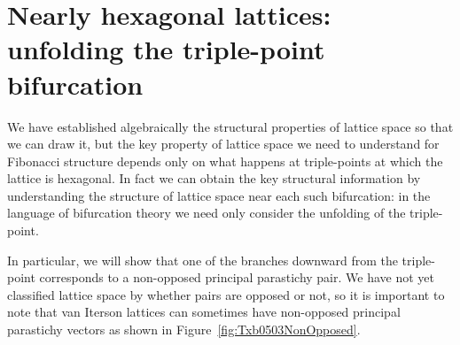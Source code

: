 \section[Unfolding the triple-point bifurcation]{Nearly hexagonal lattices: unfolding the triple-point bifurcation}
We have established algebraically the structural properties of lattice space so that we can draw it, but the key property of lattice space we need to understand for Fibonacci structure depends only on what happens at triple-points at which the lattice is hexagonal. In fact we can obtain the key structural information by understanding the structure of lattice space near each such bifurcation: in the language of bifurcation theory we need only consider the unfolding of the triple-point.  

In particular, we will show that one of the branches downward from the triple-point corresponds to a non-opposed principal parastichy pair. We have not yet classified lattice space by whether pairs are opposed or not, so it is important to note that van Iterson lattices can sometimes have non-opposed principal parastichy vectors as shown in  Figure~\ref{fig:Txb0503NonOpposed}. 

%

